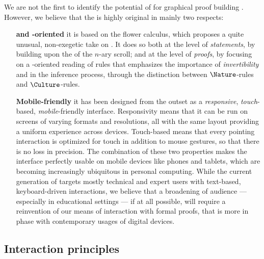 \begin{scope}
We are not the first to identify the potential of  for graphical proof
building . However, we believe that the
 is highly original in mainly two respects:
\begin{itemize}
  \item[\textbf{\kl{Intuitionistic} and \kl{goal}-oriented}] it is based on the flower
  calculus, which proposes a quite unusual, non-exegetic take on . It does so
  both at the level of \emph{statements}, by building upon the 
   of the $n$-ary scroll; and at the level of \emph{proofs}, by focusing on
  a -oriented reading of rules that emphasizes the importance of
  \emph{invertibility} and \emph{} in the inference process, through
  the distinction between $\Nature$-rules and $\Culture$-rules.
  \item[\textbf{Mobile-friendly}] it has been designed from the outset as a
  \emph{responsive}, \emph{touch}-based, \emph{mobile}-friendly interface.
  Responsivity means that it can be run on screens of varying formats and
  resolutions, all with the same layout providing a uniform experience across
  devices. Touch-based means that every pointing interaction is optimized for
  touch in addition to mouse gestures, so that there is no loss in precision.
  The combination of these two properties makes the interface perfectly usable
  on mobile devices like phones and tablets, which are becoming increasingly
  ubiquitous in personal computing. While the current generation of  targets mostly technical and expert users with text-based,
  keyboard-driven interactions, we believe that a broadening of audience ---
  especially in educational settings --- if at all possible, will require a
  reinvention of our means of interaction with formal proofs, that is more in
  phase with contemporary usages of digital devices.
\end{itemize}

\subsection{Interaction principles}


\end{scope}
